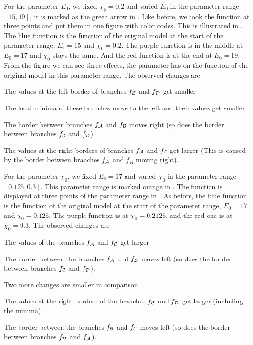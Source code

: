 For the parameter $E_0$, we fixed $\chi_0 = 0.2$ and varied $E_0$ in the parameter range $[15, 19]$, it is marked as the green arrow in .
Like before, we took the function at three points and put them in one figure with color codes.
This is illustrated in .
The blue function is the function of the original model at the start of the parameter range, $E_0 = 15$ and $\chi_0 = 0.2$.
The purple function is in the middle at $E_0 = 17$ and $\chi_0$ stays the same.
And the red function is at the end at $E_0 = 19$.
From the figure we can see three effects, the parameter has on the function of the original model in this parameter range.
The observed changes are
\begin{enumerate*}
	\item The values at the left border of branches $f_{\mathcal{B}}$ and $f_{\mathcal{D}}$ get smaller
	\item The local minima of these branches move to the left and their values get smaller
	\item The border between branches $f_{\mathcal{A}}$ and $f_{\mathcal{B}}$ moves right (so does the border between branches $f_{\mathcal{C}}$ and $f_{\mathcal{D}}$)
	\item The values at the right borders of branches $f_{\mathcal{A}}$ and $f_{\mathcal{C}}$ get larger (This is caused by the border between branches $f_{\mathcal{A}}$ and $f_B$ moving right).
\end{enumerate*}

For the parameter $\chi_0$, we fixed $E_0 = 17$ and varied $\chi_0$ in the parameter range $[0.125, 0.3]$.
This parameter range is marked orange in .
The function is displayed at three points of the parameter range in .
As before, the blue function is the function of the original model at the start of the parameter range, $E_0 = 17$ and $\chi_0 = 0.125$.
The purple function is at $\chi_0 = 0.2125$, and the red one is at $\chi_0 = 0.3$.
The observed changes are
\begin{enumerate*}
	\item The values of the branches $f_{\mathcal{A}}$ and $f_{\mathcal{C}}$ get larger
	\item The border between the branches $f_{\mathcal{A}}$ and $f_{\mathcal{B}}$ moves left (so does the border between branches $f_{\mathcal{C}}$ and $f_{\mathcal{D}}$).
\end{enumerate*}
Two more changes are smaller in comparison
\begin{enumerate*}
	\item The values at the right borders of the branches $f_{\mathcal{B}}$ and $f_{\mathcal{D}}$ get larger (including the minima)
	\item The border between the branches $f_{\mathcal{B}}$ and $f_{\mathcal{C}}$ moves left (so does the border between branches $f_{\mathcal{D}}$ and $f_{\mathcal{A}}$).
\end{enumerate*}

